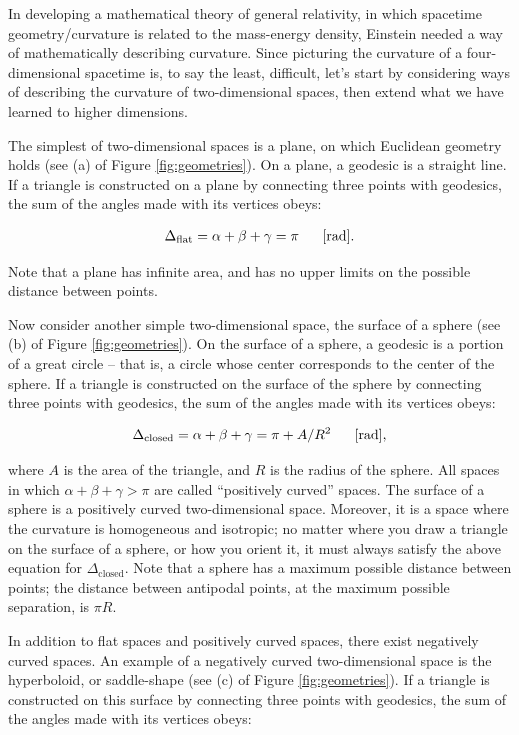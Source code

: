 \documentclass[a4paper,11pt]{article}
\begin{document}
In developing a mathematical theory of general relativity, in which spacetime geometry/curvature is related to the mass-energy density, Einstein needed a way of mathematically describing curvature. Since picturing the curvature of a four-dimensional spacetime is, to say the least, difficult, let's start by considering ways of describing the curvature of two-dimensional spaces, then extend what we have learned to higher dimensions.

{\noindent}The simplest of two-dimensional spaces is a plane, on which Euclidean geometry holds (see (a) of Figure \ref{fig:geometries}). On a plane, a geodesic is a straight line. If a triangle is constructed on a plane by connecting three points with geodesics, the sum of the angles made with its vertices obeys:

\begin{align*}
    \Delta_\mathrm{flat} = \alpha + \beta + \gamma = \pi ~~~~~[{\rm rad}].
\end{align*}

{\noindent}Note that a plane has infinite area, and has no upper limits on the possible distance between points.

{\noindent}Now consider another simple two-dimensional space, the surface of a sphere (see (b) of Figure \ref{fig:geometries}). On the surface of a sphere, a geodesic is a portion of a great circle -- that is, a circle whose center corresponds to the center of the sphere. If a triangle is constructed on the surface of the sphere by connecting three points with geodesics, the sum of the angles made with its vertices obeys:

\begin{align*}
    \Delta_\mathrm{closed} = \alpha + \beta + \gamma = \pi + A/R^2 ~~~~~[{\rm rad}],
\end{align*}

{\noindent}where $A$ is the area of the triangle, and $R$ is the radius of the sphere. All spaces in which $\alpha + \beta + \gamma > \pi$ are called ``positively curved'' spaces. The surface of a sphere is a positively curved two-dimensional space. Moreover, it is a space where the curvature is homogeneous and isotropic; no matter where you draw a triangle on the surface of a sphere, or how you orient it, it must always satisfy the above equation for $\Delta_\mathrm{closed}$. Note that a sphere has a maximum possible distance between points; the distance between antipodal points, at the maximum possible separation, is $\pi R$.

{\noindent}In addition to flat spaces and positively curved spaces, there exist negatively curved spaces. An example of a negatively curved two-dimensional space is the hyperboloid, or saddle-shape (see (c) of Figure \ref{fig:geometries}). If a triangle is constructed on this surface by connecting three points with geodesics, the sum of the angles made with its vertices obeys:
\end{document}
